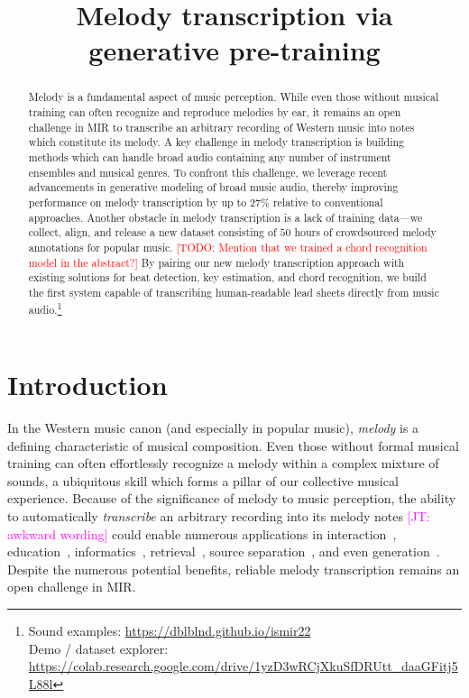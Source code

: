 \documentclass{article}
\title{
Melody transcription via generative pre-training
}
\newcommand{\todo}[1]{\textcolor{red}{[TODO: #1]}}
\newcommand\john[1]{\textcolor{magenta}{[JT: #1]}}
\begin{document}
\maketitle

\begin{abstract}
Melody 
is a fundamental aspect 
of 
music perception. 
While even those without musical training can often recognize and reproduce melodies by ear, it remains an open challenge in MIR to transcribe an arbitrary recording of Western music into notes which constitute its melody. 
A key challenge in melody transcription is building methods which can handle broad audio containing any number of instrument ensembles and musical genres. 
To confront this challenge, we leverage recent advancements in generative modeling of broad music audio, thereby improving performance on melody transcription by up to $27$\% relative to conventional approaches. 
Another obstacle in melody transcription is a lack of training data---we collect, align, and release a new dataset consisting of $50$ hours of crowdsourced melody annotations for popular music. 
\todo{Mention that we trained a chord recognition model in the abstract?}
By pairing our new melody transcription approach with existing solutions for beat detection, key estimation, and chord recognition, 
we build the first system capable of transcribing human-readable lead sheets directly from music audio.\footnote{Sound examples: \url{https://dblblnd.github.io/ismir22} \\
Demo / dataset explorer: \url{https://colab.research.google.com/drive/1yzD3wRCjXkuSfDRUtt_daaGFitj5L88l}\label{sound_examples}}
\end{abstract}


\section{Introduction}\label{sec:introduction}

In the Western music canon (and especially in popular music), 
\emph{melody} is a defining characteristic of musical composition. 
Even those without formal musical training can often effortlessly recognize a melody within a complex mixture of sounds, 
a ubiquitous skill which forms a pillar of our collective musical experience. %
Because of the significance of melody to music perception, 
the ability to automatically \emph{transcribe} an arbitrary recording into 
its melody notes \john{awkward wording}
could enable numerous applications in 
interaction~\cite{ryynanen2008accompaniment}, 
education~\cite{droe2006music}, 
informatics~\cite{bainbridge1999towards}, 
retrieval~\cite{ghias1995query}, 
source separation~\cite{ewert2014score},
and even generation~\cite{hawthorne2019enabling}.
Despite the numerous potential benefits, 
reliable melody transcription remains an open challenge in MIR.
\end{document}

